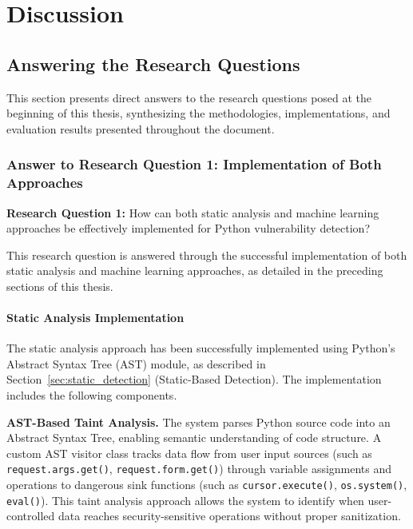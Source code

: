 \chapter{Discussion}
\label{ch:discussion}

\section{Answering the Research Questions}
\label{sec:answering_rq}

This section presents direct answers to the research questions posed at the beginning of this thesis, synthesizing the methodologies, implementations, and evaluation results presented throughout the document.

\subsection{Answer to Research Question 1: Implementation of Both Approaches}
\label{sec:answer_rq1}

\textbf{Research Question 1:} How can both static analysis and machine learning approaches be effectively implemented for Python vulnerability detection?

This research question is answered through the successful implementation of both static analysis and machine learning approaches, as detailed in the preceding sections of this thesis.

\subsubsection{Static Analysis Implementation}
\label{sec:static_analysis_impl}

The static analysis approach has been successfully implemented using Python's Abstract Syntax Tree (AST) module, as described in Section~\ref{sec:static_detection} (Static-Based Detection). The implementation includes the following components.

\textbf{AST-Based Taint Analysis.}
The system parses Python source code into an Abstract Syntax Tree, enabling semantic understanding of code structure. A custom AST visitor class tracks data flow from user input sources (such as \texttt{request.args.get()}, \texttt{request.form.get()}) through variable assignments and operations to dangerous sink functions (such as \texttt{cursor.execute()}, \texttt{os.system()}, \texttt{eval()}). This taint analysis approach allows the system to identify when user-controlled data reaches security-sensitive operations without proper sanitization.

